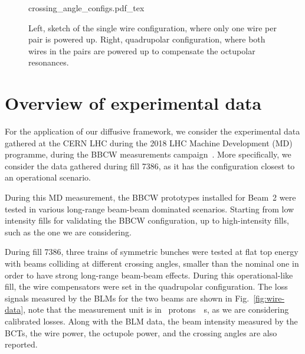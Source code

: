 \begin{figure}[hpt]
    \centering
    \def\svgwidth{1.0\textwidth}
    {crossing_angle_configs.pdf_tex}
    \caption{Left, sketch of the single wire configuration, where only one wire per pair is powered up. Right, quadrupolar configuration, where both wires in the pairs are powered up to compensate the octupolar resonances.}
    \label{fig:wire-configs}
\end{figure}

\section{Overview of experimental data}

For the application of our diffusive framework, we consider the experimental data gathered at the CERN LHC during the 2018 LHC Machine Development (MD) programme, during the BBCW measurements campaign~\cite{Poyet:2703503}. More specifically, we consider the data gathered during fill 7386, as it has the configuration closest to an operational scenario.

During this MD measurement, the BBCW prototypes installed for Beam~2 were tested in various long-range beam-beam dominated scenarios. Starting from low intensity fills for validating the BBCW configuration, up to high-intensity fills, such as the one we are considering. 

During fill 7386, three trains of symmetric bunches were tested at flat top energy with beams colliding at different crossing angles, smaller than the nominal one in order to have strong long-range beam-beam effects. During this operational-like fill, the wire compensators were set in the quadrupolar configuration. The loss signals measured by the BLMs for the two beams are shown in Fig.~\ref{fig:wire-data}, note that the measurement unit is in \SI{}{protons \per s}, as we are considering calibrated losses. Along with the BLM data, the beam intensity measured by the BCTs, the wire power, the octupole power, and the crossing angles are also reported. 

